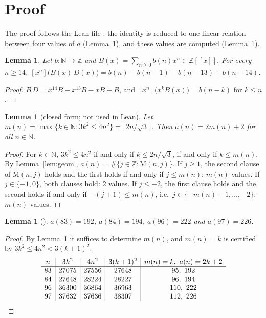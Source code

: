 \documentclass[11pt]{amsart}
\theoremstyle{plain}
\newtheorem{lemma}[theorem]{Lemma}
\theoremstyle{definition}
\newcommand{\N}{\mathbb{N}}
\newcommand{\Z}{\mathbb{Z}}
\newcommand{\fps}{\Z[\![x]\!]}
\newcommand{\coef}[1]{[x^{#1}]}
\newcommand{\MI}{\mathrm{M}}
\begin{document}
\section{Proof}\label{sec:proof}

The proof follows the Lean file : the identity is reduced to one linear relation between four values of $a$ (Lemma~\ref{lem:coef}), and these values are computed (Lemma~\ref{lem:vals}).

\begin{lemma}\label{lem:coef}
Let $b\colon\N\to\Z$ and $B(x)=\sum_{n\ge0}b(n)x^n\in\fps$. For every $n\ge14$,
$\coef{n}\bigl(B(x)\,D(x)\bigr)=b(n)-b(n-1)-b(n-13)+b(n-14)$.
\end{lemma}

\begin{proof}
$B\,D=x^{14}B-x^{13}B-xB+B$, and $\coef{n}\bigl(x^kB(x)\bigr)=b(n-k)$ for $k\le n$.
\end{proof}

\begin{lemma}[closed form; not used in Lean]\label{lem:closed}
Let $m(n)=\max\{k\in\N:3k^2\le4n^2\}=\lfloor 2n/\sqrt3\rfloor$. Then $a(n)=2m(n)+2$ for all $n\in\N$.
\end{lemma}

\begin{proof}
For $k\in\N$, $3k^2\le4n^2$ if and only if $k\le 2n/\sqrt3$, if and only if $k\le m(n)$. By Lemma~\ref{lem:geom}, $a(n)=\#\{j\in\Z:\MI(n,j)\}$. If $j\ge1$, the second clause of $\MI(n,j)$ holds and the first holds if and only if $j\le m(n)$: $m(n)$ values. If $j\in\{-1,0\}$, both clauses hold: $2$ values. If $j\le-2$, the first clause holds and the second holds if and only if $-(j+1)\le m(n)$, i.e.\ $j\in\{-m(n)-1,\dots,-2\}$: $m(n)$ values.
\end{proof}

\begin{lemma}[]\label{lem:vals}
$a(83)=192$, $a(84)=194$, $a(96)=222$ and $a(97)=226$.
\end{lemma}

\begin{proof}
By Lemma~\ref{lem:closed} it suffices to determine $m(n)$, and $m(n)=k$ is certified by $3k^2\le4n^2<3(k+1)^2$:
\[
\begin{array}{c|c|c|c|c}
 n & 3k^2 & 4n^2 & 3(k+1)^2 & m(n)=k,\ a(n)=2k+2\\\hline
 83 & 27075 & 27556 & 27648 & 95,\ 192\\
 84 & 27648 & 28224 & 28227 & 96,\ 194\\
 96 & 36300 & 36864 & 36963 & 110,\ 222\\
 97 & 37632 & 37636 & 38307 & 112,\ 226
\end{array}\qedhere
\]
\end{proof}
\end{document}
